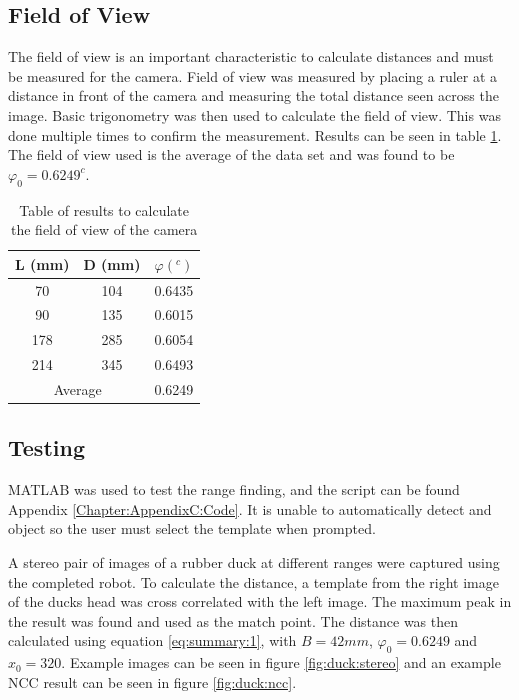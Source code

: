 \subsection{Field of View}
The field of view is an important characteristic to calculate distances and must be measured for the camera. Field of view was measured by placing a ruler at a distance in front of the camera and measuring the total distance seen across the image. Basic trigonometry was then used to calculate the field of view. This was done multiple times to confirm the measurement. Results can be seen in table \ref{table:fieldofview}. The field of view used is the average of the data set and was found to be $\varphi_0 = 0.6249^c$. 
\begin{table}
\caption{Table of results to calculate the field of view of the camera}
\label{table:fieldofview}
\centering
\begin{tabular}{|c|c|c|} \hline
L (mm) & D (mm) & $\varphi (^c)$ \\ \hline
70 & 104 & 0.6435\\
90 & 135 &0.6015\\
178 & 285 &0.6054\\
214 & 345 &0.6493 \\ \hline
\multicolumn{2}{|c|}{Average} & 0.6249 \\ \hline
\end{tabular}

\end{table}



\subsection{Testing}
MATLAB was used to test the range finding, and the script can be found Appendix \ref{Chapter:AppendixC:Code}. It is unable to automatically detect and object so the user must select the template when prompted. 

A stereo pair of images of a rubber duck at different ranges were captured using the completed robot. To calculate the distance, a template from the right image of the ducks head was cross correlated with the left image. The maximum peak in the result was found and used as the match point. The distance was then calculated using equation \eqref{eq:summary:1}, with $B=42mm$, $\varphi_0=0.6249$ and $x_0=320$. Example images can be seen in figure \ref{fig:duck:stereo} and an example NCC result can be seen in figure \ref{fig:duck:ncc}. 

